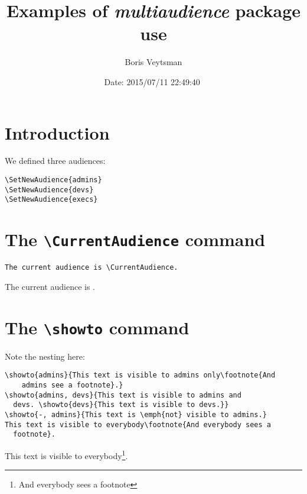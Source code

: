\documentclass{article}
\begin{document}
\title{Examples of \textsl{multiaudience} package use}
\date{$ $Date: 2015/07/11 22:49:40 $ $}
\author{Boris Veytsman}
\maketitle

\clearpage
\tableofcontents
\clearpage

\section{Introduction}
\label{sec:intro}

We defined three audiences:
\begin{verbatim}
\SetNewAudience{admins}
\SetNewAudience{devs}
\SetNewAudience{execs}
\end{verbatim}


\section{The \texttt{\textbackslash CurrentAudience} command}
\label{sec:CurrentAudience}

\begin{verbatim}
The current audience is \CurrentAudience.
\end{verbatim}

The current audience is \CurrentAudience.

\section{The \texttt{\textbackslash showto} command}
\label{sec:showto}


Note the nesting here:
\begin{verbatim}
\showto{admins}{This text is visible to admins only\footnote{And
    admins see a footnote}.}
\showto{admins, devs}{This text is visible to admins and
  devs. \showto{devs}{This text is visible to devs.}}  
\showto{-, admins}{This text is \emph{not} visible to admins.}
This text is visible to everybody\footnote{And everybody sees a
  footnote}.  
\end{verbatim}

This text is visible to everybody\footnote{And everybody sees a
  footnote}.   
\end{document}
